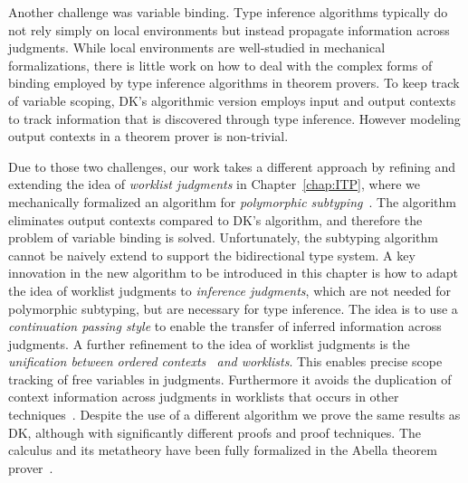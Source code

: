 Another challenge was variable binding. Type inference algorithms
typically do not rely simply on local environments but instead
propagate information across judgments. While local environments are
well-studied in mechanical formalizations, there is little work on how
to deal with the complex forms of binding employed by type inference algorithms
in theorem provers. To
keep track of variable scoping, DK's algorithmic version employs input
and output contexts to track information that is discovered through
type inference. However modeling output contexts in a theorem prover
is non-trivial.

Due to those two challenges, our work takes a different approach by refining and
extending the idea of \emph{worklist judgments}
in Chapter~\ref{chap:ITP},
where we mechanically formalized an algorithm for
\emph{polymorphic subtyping}~\citep{odersky1996putting}.
The algorithm eliminates output contexts compared to DK's algorithm,
and therefore the problem of variable binding is solved.
Unfortunately, the subtyping algorithm cannot be naively extend
to support the bidirectional type system.
A key innovation in the new algorithm to be introduced in this chapter is how
to adapt the idea of worklist judgments to
\emph{inference judgments}, which are not needed for polymorphic
subtyping, but are necessary for type inference.
The idea is to use a \emph{continuation
passing style} to enable the transfer of inferred information across
judgments. A further refinement to the idea of worklist judgments is
the \emph{unification between ordered
  contexts~\citep{gundry2010type,dunfield2013complete} and worklists}.
This enables precise scope tracking of free variables in
judgments. Furthermore it avoids the duplication of context
information across judgments in worklists that occurs in other
techniques~\citep{Reed2009,Abel2011higher}.
Despite the use of a different algorithm we prove the
same results as DK, although with significantly different proofs and
proof techniques. The calculus and its metatheory
have been fully formalized in the Abella theorem prover~\citep{AbellaDesc}.



%





